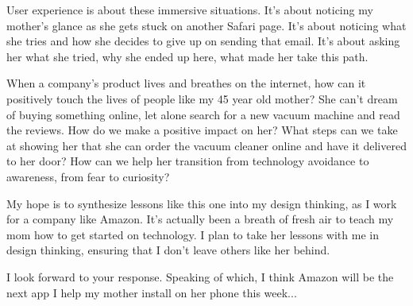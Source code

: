 \documentclass[10pt,a4paper,sans]{moderncv}        %
\begin{document}
User experience is about these immersive situations.  It's about noticing my mother's glance as she gets stuck on another Safari page.  It's about noticing what she tries and how she decides to give up on sending that email.  It's about asking her what she tried, why she ended up here, what made her take this path.  

When a company's product lives and breathes on the internet, how can it positively touch the lives of people like my 45 year old mother?  She can't dream of buying something online, let alone search for a new vacuum machine and read the reviews.  How do we make a positive impact on her? What steps can we take at showing her that she can order the vacuum cleaner online and have it delivered to her door?  How can we help her transition from technology avoidance to awareness, from fear to curiosity?

My hope is to synthesize lessons like this one into my design thinking, as I work for a company like Amazon.  It's actually been a breath of fresh air to teach my mom how to get started on technology. I plan to take her lessons with me in design thinking, ensuring that I don't leave others like her behind.  

I look forward to your response.  Speaking of which, I think Amazon will be the next app I help my mother install on her phone this week...

\bigskip

\makeletterclosing

\end{document}
